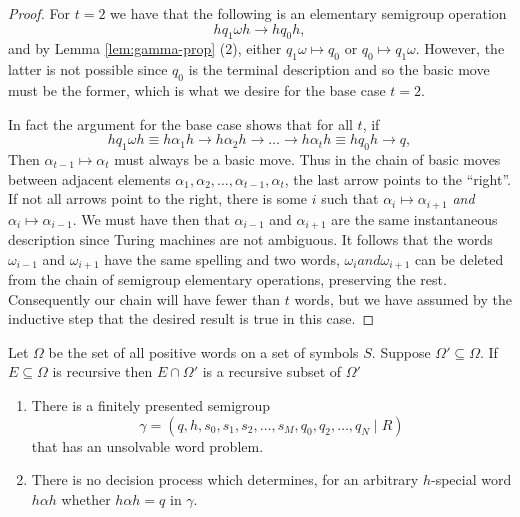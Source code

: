 \begin{proof}
  For $t = 2$ we have that the following is an elementary semigroup operation
  \begin{equation*}
    hq_1 \omega h  \rightarrow  h q_0 h,
  \end{equation*}
  and by Lemma \ref{lem:gamma-prop} (2), either $q_1 \omega \mapsto q_0$ or $q_0 \mapsto q_1 \omega$. However, the latter is not possible since $q_0$ is the terminal description and so the basic move must be the former, which is what we desire for the base case $t = 2$.

  In fact the argument for the base case shows that for all $t$, if
  \begin{equation*}
    hq_1 \omega h \equiv h\alpha_1h \rightarrow h\alpha_2 h \rightarrow \dots \rightarrow h\alpha_t h \equiv h q_0 h \rightarrow q,
  \end{equation*}
  Then $\alpha_{t-1} \mapsto \alpha_t$ must always be a basic move. Thus in the chain of basic moves between adjacent elements $\alpha_1, \alpha_2, \dots, \alpha_{t-1}, \alpha_t$, the last arrow points to the ``right''. If not all arrows point to the right, there is some $i$ such that $\alpha_i \mapsto \alpha_{i+1}$ \emph{and} $\alpha_i \mapsto \alpha_{i-1}$. We must have then that $\alpha_{i-1}$ and $\alpha_{i+1}$ are the same instantaneous description since Turing machines are not ambiguous. It follows that the words $\omega_{i-1}$ and $\omega_{i+1}$ have the same spelling and two words, $\omega_i and \omega_{i+1}$ can be deleted from the chain of semigroup elementary operations, preserving the rest. Consequently our chain will have fewer than $t$ words, but we have assumed by the inductive step that the desired result is true in this case.
\end{proof}

\begin{lemma}
  Let $\Omega$ be the set of all positive words on a set of symbols $S$. Suppose $\Omega' \subseteq \Omega$. If $E \subseteq \Omega$ is recursive then $E \cap \Omega'$ is a recursive subset of $\Omega'$
\end{lemma}

\begin{theorem}
  \begin{enumerate}
  \item There is a finitely presented semigroup
    \begin{equation*}
      \gamma = (q,h,s_0,s_1,s_2, \dots, s_M, q_0,q_2, \dots, q_N \mid R)
    \end{equation*}
    that has an unsolvable word problem.
  \item There is no decision process which determines, for an arbitrary $h$-special word $h\alpha h$ whether $h\alpha h = q$ in $\gamma$.
  \end{enumerate}
\end{theorem}


